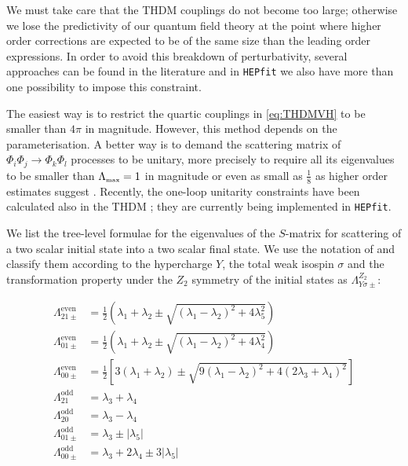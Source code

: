 \documentclass[preprint,3p,12pt]{elsarticle}
\newcommand{\HEPfit}{\texttt{HEPfit}\xspace}
\begin{document}
We must take care that the THDM couplings do not become too large; otherwise we lose the predictivity of our quantum field theory at the point where higher order corrections are expected to be of the same size than the leading order expressions. In order to avoid this breakdown of perturbativity, several approaches can be found in the literature and in \HEPfit we also have more than one possibility to impose this constraint.

The easiest way is to restrict the quartic couplings in \eqref{eq:THDMVH} to be smaller than $4\pi$ in magnitude. However, this method depends on the parameterisation. A better way is to demand the scattering matrix of $\Phi_i \Phi_j\to \Phi_k \Phi_l$ processes to be unitary, more precisely to require all its eigenvalues to be smaller than $\Lambda_{\text{\tiny{max}}}=1$ in magnitude \cite{Huffel:1980sk,Maalampi:1991fb,Kanemura:1993hm,Akeroyd:2000wc,Ginzburg:2005dt} or even as small as $\frac18$ as higher order estimates suggest \cite{Baglio:2014nea,Chowdhury:2015yja}. Recently, the one-loop unitarity constraints have been calculated also in the THDM \cite{Grinstein:2015rtl}; they are currently being implemented in \HEPfit.

We list the tree-level formulae for the eigenvalues of the $S$-matrix for scattering of a two scalar initial state into a two scalar final state. We use the notation of \cite{Ginzburg:2005dt} and classify them according to the hypercharge $Y$, the total weak isospin $\sigma$ and the transformation property under the $Z_2$ symmetry of the initial states as $\Lambda _{Y\sigma \pm}^{Z_2}$:

\begin{align}
 \Lambda _{21\pm}^{\text{even}} &= \frac12 \left( \lambda_1 +\lambda_2 \pm \sqrt{(\lambda_1-\lambda_2)^2+4\lambda_5^2}\right) \nonumber \\
 \Lambda _{01\pm}^{\text{even}} &= \frac12 \left( \lambda_1 +\lambda_2 \pm \sqrt{(\lambda_1-\lambda_2)^2+4\lambda_4^2}\right) \nonumber \\
 \Lambda _{00\pm}^{\text{even}} &= \frac12 \left[ 3\left( \lambda_1 +\lambda_2 \right) \pm \sqrt{9(\lambda_1-\lambda_2)^2+4(2\lambda_3+\lambda_4)^2}\right] \nonumber \\
 \Lambda _{21}^{\text{odd}} &= \lambda_3 + \lambda_4\nonumber \\
 \Lambda _{20}^{\text{odd}} &= \lambda_3 - \lambda_4\nonumber \\
 \Lambda _{01\pm}^{\text{odd}} &= \lambda_3 \pm |\lambda_5|\nonumber \\
 \Lambda _{00\pm}^{\text{odd}} &= \lambda_3 + 2\lambda_4 \pm 3 |\lambda_5|\nonumber
\end{align}
\end{document}

